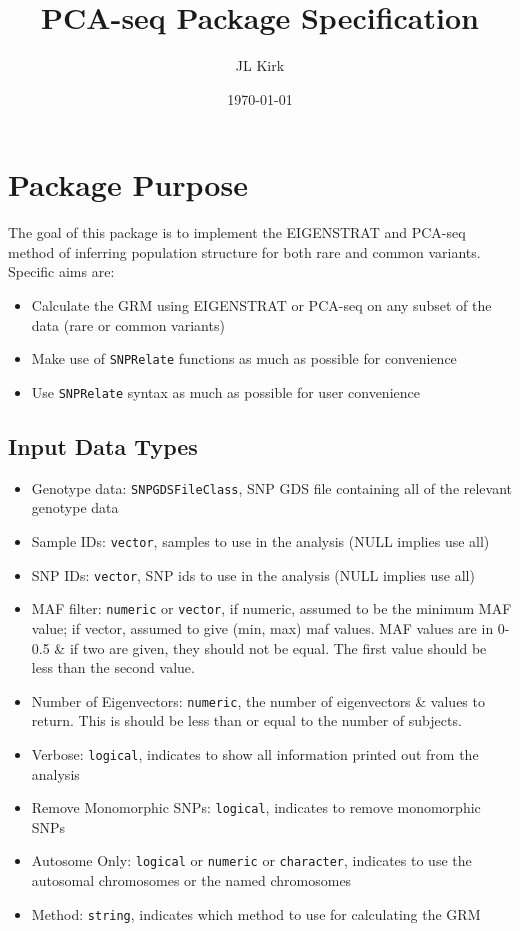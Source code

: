 \documentclass[11pt]{article}
\title{PCA-seq Package Specification}
\author{JL Kirk}
\date{\today}
\begin{document}
\maketitle

\section{Package Purpose}
The goal of this package is to implement the EIGENSTRAT and PCA-seq method of inferring population structure for both rare and common variants. Specific aims are:
\begin{itemize}
\item Calculate the GRM using EIGENSTRAT or PCA-seq on any subset of the data (rare or common variants)
\item Make use of \texttt{SNPRelate} functions as much as possible for convenience
\item Use \texttt{SNPRelate} syntax as much as possible for user convenience	
\end{itemize}

\subsection{Input Data Types}
\label{input-var}

\begin{itemize}
\item Genotype data: \texttt{SNPGDSFileClass}, SNP GDS file containing all of the relevant genotype data
\item Sample IDs: \texttt{vector}, samples to use in the analysis (NULL implies use all)
\item SNP IDs: \texttt{vector}, SNP ids to use in the analysis (NULL implies use all)
\item MAF filter: \texttt{numeric} or \texttt{vector}, if numeric, assumed to be the minimum MAF value; if vector, assumed to give (min, max) maf values. MAF values are in 0-0.5 \& if two are given, they should not be equal. The first value should be less than the second value.
\item Number of Eigenvectors: \texttt{numeric}, the number of eigenvectors \& values to return. This is should be less than or equal to the number of subjects.
\item Verbose: \texttt{logical}, indicates to show all information printed out from the analysis
\item Remove Monomorphic SNPs: \texttt{logical}, indicates to remove monomorphic SNPs
\item Autosome Only: \texttt{logical} or \texttt{numeric} or \texttt{character}, indicates to use the autosomal chromosomes or the named chromosomes
\item Method: \texttt{string}, indicates which method to use for calculating the GRM
\end{itemize}
\end{document}
